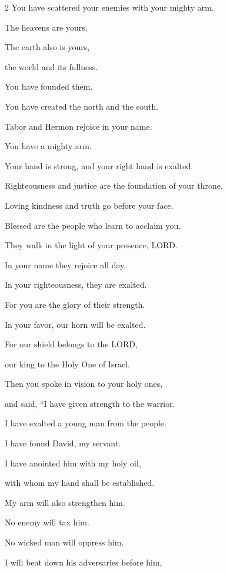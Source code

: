 \begin{multicols}{2}
	You have scattered your enemies with your mighty arm.
	
	
	\myverse{}The heavens are yours.
	
	The earth also is yours,
	
	the world and its fullness.
	
	You have founded them.
	
	
	\myverse{}You have created the north and the south.
	
	Tabor and Hermon rejoice in your name.
	
	
	\myverse{}You have a mighty arm.
	
	Your hand is strong, and your right hand is exalted.
	
	
	\myverse{}Righteousness and justice are the foundation of your throne.
	
	Loving kindness and truth go before your face.
	
	
	\myverse{}Blessed are the people who learn to acclaim you.
	
	They walk in the light of your presence, LORD.
	
	
	\myverse{}In your name they rejoice all day.
	
	In your righteousness, they are exalted.
	
	
	\myverse{}For you are the glory of their strength.
	
	In your favor, our horn will be exalted.
	
	
	\myverse{}For our shield belongs to the LORD,
	
	our king to the Holy One of Israel.
	
	\vspace{\baselineskip}
	
	\myverse{}Then you spoke in vision to your holy ones,
	
	and said, “I have given strength to the warrior.
	
	I have exalted a young man from the people.
	
	
	\myverse{}I have found David, my servant.
	
	I have anointed him with my holy oil,
	
	
	\myverse{}with whom my hand shall be established.
	
	My arm will also strengthen him.
	
	
	\myverse{}No enemy will tax him.
	
	No wicked man will oppress him.
	
	
	\myverse{}I will beat down his adversaries before him,
	

\end{multicols}
